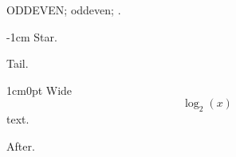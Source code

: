 \documentclass{article}
\begin{document}
\makeatletter
\checkoddpage\ifodd\cp@tempcnt ODD\else EVEN\fi; \easypagecheck\checkoddpage\ifoddpage odd\else even\fi; \thecp@cntr.
\makeatother

\begin{adjustwidth*}{}{-1cm}
Star.
\end{adjustwidth*}
Tail.

\begin{adjustwidth}{1cm}{0pt}
Wide $$\log_2(x)$$ text.
\end{adjustwidth}
After.
\end{document}
